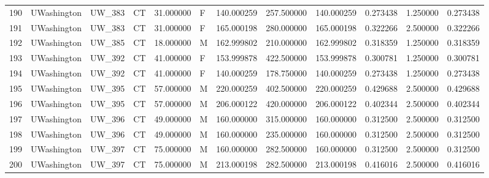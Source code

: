 \begin{tabular}{llllrlrrrrrr}
190    &     UWashington &       UW\_383 &                 CT &  31.000000 &        F &       140.000259 &    257.500000 &  140.000259 &               0.273438 &            1.250000 &          0.273438 \\
191    &     UWashington &       UW\_383 &                 CT &  31.000000 &        F &       165.000198 &    280.000000 &  165.000198 &               0.322266 &            2.500000 &          0.322266 \\
192    &     UWashington &       UW\_385 &                 CT &  18.000000 &        M &       162.999802 &    210.000000 &  162.999802 &               0.318359 &            1.250000 &          0.318359 \\
193    &     UWashington &       UW\_392 &                 CT &  41.000000 &        F &       153.999878 &    422.500000 &  153.999878 &               0.300781 &            1.250000 &          0.300781 \\
194    &     UWashington &       UW\_392 &                 CT &  41.000000 &        F &       140.000259 &    178.750000 &  140.000259 &               0.273438 &            1.250000 &          0.273438 \\
195    &     UWashington &       UW\_395 &                 CT &  57.000000 &        M &       220.000259 &    402.500000 &  220.000259 &               0.429688 &            2.500000 &          0.429688 \\
196    &     UWashington &       UW\_395 &                 CT &  57.000000 &        M &       206.000122 &    420.000000 &  206.000122 &               0.402344 &            2.500000 &          0.402344 \\
197    &     UWashington &       UW\_396 &                 CT &  49.000000 &        M &       160.000000 &    315.000000 &  160.000000 &               0.312500 &            2.500000 &          0.312500 \\
198    &     UWashington &       UW\_396 &                 CT &  49.000000 &        M &       160.000000 &    235.000000 &  160.000000 &               0.312500 &            2.500000 &          0.312500 \\
199    &     UWashington &       UW\_397 &                 CT &  75.000000 &        M &       160.000000 &    282.500000 &  160.000000 &               0.312500 &            2.500000 &          0.312500 \\
200    &     UWashington &       UW\_397 &                 CT &  75.000000 &        M &       213.000198 &    282.500000 &  213.000198 &               0.416016 &            2.500000 &          0.416016 \\

\end{tabular}
